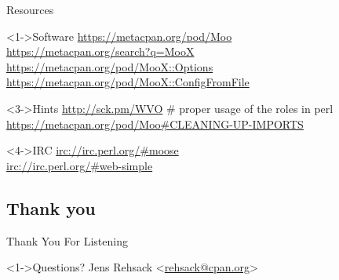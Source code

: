 \documentclass[ngerman,xcolor={table,dvipsnames},smaller,compress,hyperref={bookmarks,colorlinks}]{beamer}%
\begin{document}
\begin{frame}[t,fragile]{Resources}
\begin{block}<1->{Software}
\url{https://metacpan.org/pod/Moo} \\
\url{https://metacpan.org/search?q=MooX} \\
\url{https://metacpan.org/pod/MooX::Options} \\
\url{https://metacpan.org/pod/MooX::ConfigFromFile} \\
\end{block}

\begin{block}<3->{Hints}
\url{http://sck.pm/WVO} \# proper usage of the roles in perl \\
\url{https://metacpan.org/pod/Moo\#CLEANING-UP-IMPORTS}
\end{block}

\begin{block}<4->{IRC}
\url{irc://irc.perl.org/#moose} \\
\url{irc://irc.perl.org/#web-simple}
\end{block}
\end{frame}

\subsection{Thank you}

\begin{frame}[fragile]{Thank You For Listening}
\begin{block}<1->{Questions?}
Jens Rehsack \textless{}\href{mailto:rehsack@cpan.org}{rehsack@cpan.org}\textgreater{}
\end{block}
\end{frame}
\end{document}
